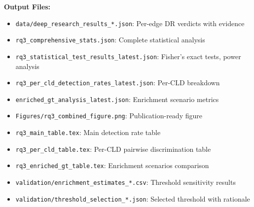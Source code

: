 \textbf{Output Files:}
\begin{itemize}[noitemsep]
    \item \texttt{data/deep\_research\_results\_*.json}: Per-edge DR verdicts with evidence
    \item \texttt{rq3\_comprehensive\_stats.json}: Complete statistical analysis
    \item \texttt{rq3\_statistical\_test\_results\_latest.json}: Fisher's exact tests, power analysis
    \item \texttt{rq3\_per\_cld\_detection\_rates\_latest.json}: Per-CLD breakdown
    \item \texttt{enriched\_gt\_analysis\_latest.json}: Enrichment scenario metrics
    \item \texttt{Figures/rq3\_combined\_figure.png}: Publication-ready figure
    \item \texttt{rq3\_main\_table.tex}: Main detection rate table
    \item \texttt{rq3\_per\_cld\_table.tex}: Per-CLD pairwise discrimination table
    \item \texttt{rq3\_enriched\_gt\_table.tex}: Enrichment scenarios comparison
    \item \texttt{validation/enrichment\_estimates\_*.csv}: Threshold sensitivity results
    \item \texttt{validation/threshold\_selection\_*.json}: Selected threshold with rationale
\end{itemize}

